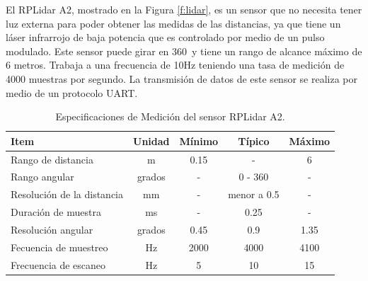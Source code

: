
El RPLidar A2, mostrado en la Figura \ref{f:lidar}, es un sensor que no necesita tener 
luz externa para poder obtener las medidas de las distancias, ya que tiene 
un láser infrarrojo de baja potencia que es controlado por medio de un pulso 
modulado. Este sensor puede girar en 360\grad ~y tiene un rango de alcance máximo 
de 6 metros. Trabaja a una frecuencia de 10Hz teniendo una tasa de medición de 4000 
muestras por segundo. La transmisión de datos de este sensor se realiza por medio de un 
protocolo UART.




\begin{table}[htbp]
\begin{center}
\begin{tabular}{|l|c|c|c|c|}
	\hline
	Item & Unidad & M\'inimo & T\'ipico & M\'aximo\\
	\hline \hline
	Rango de distancia & m & 0.15 & - & 6 \\ \hline
	Rango angular & grados & - & 0 - 360 & - \\ \hline
	Resoluci\'on de la distancia & mm & - & menor a 0.5 & - \\ \hline
	Duraci\'on de muestra & ms & - & 0.25 & - \\ \hline
	Resoluci\'on angular & grados & 0.45 & 0.9 & 1.35 \\ \hline
	Fecuencia de muestreo & Hz & 2000 & 4000 & 4100 \\ \hline
	Frecuencia de escaneo & Hz & 5 & 10 & 15 \\ \hline
\end{tabular}
	\caption{Especificaciones de Medición del sensor RPLidar A2.}
	\label{tbl:medicion}
\end{center}
\end{table}

